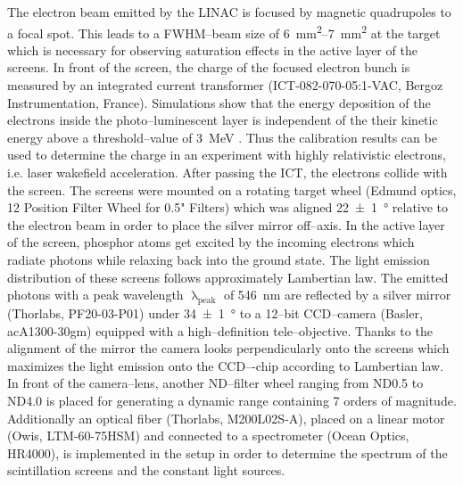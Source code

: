 \documentclass[%
reprint,
amsmath,
amssymb,
aip,
rsi, 
numerical,
floatfix,
]{revtex4-1}
\newcommand{\myCite}[1]{\textcolor{blue}{\cite{#1}}}
\begin{document}
The electron beam emitted by the LINAC is focused by magnetic quadrupoles to a focal spot.
This leads to a FWHM--beam size of \SIrange{6}{7}{\milli\metre^2} at the target which is necessary for observing saturation effects in the active layer of the screens. 
In front of the screen, the charge of the focused electron bunch is measured by an integrated current transformer (ICT-082-070-05:1-VAC, Bergoz Instrumentation, France).
Simulations show that the energy deposition of the electrons inside the photo--luminescent layer is independent of the their kinetic energy above a threshold--value of \SI{3}{\mega\electronvolt} \myCite{Hidding2007,Glinec2006,Masuda2008}.
Thus the calibration results can be used to determine the charge in an experiment with highly relativistic electrons, i.e. laser wakefield acceleration. 
After passing the ICT, the electrons collide with the screen. 
The screens were mounted on a rotating target wheel (Edmund optics, 12 Position Filter Wheel for 0.5" Filters) which was aligned \SI[separate-uncertainty = true]{22(1)}{\degree} relative to the electron beam in order to place the silver mirror off--axis. 
In the active layer of the screen, phosphor atoms get excited by the incoming electrons which radiate photons while relaxing back into the ground state. 
The light emission distribution of these screens follows approximately Lambertian law\myCite{Giakoumakis1985}. 
The emitted photons with a peak wavelength $\uplambda_{\text{peak}}$ of \SI{546}{\nano\metre} are reflected by a silver mirror (Thorlabs, PF20-03-P01) under \SI[separate-uncertainty = true]{34(1)}{\degree} to a 12–bit CCD–camera (Basler, acA1300-30gm) equipped with a high--definition tele--objective. 
Thanks to the alignment of the mirror the camera looks perpendicularly onto the screens which maximizes the light emission onto the CCD–-chip according to Lambertian law. 
In front of the camera--lens, another ND--filter wheel ranging from ND0.5 to ND4.0 is placed for generating a dynamic range containing 7 orders of magnitude. 
Additionally an optical fiber (Thorlabs, M200L02S-A), placed on a linear motor (Owis, LTM-60-75HSM) and connected to a spectrometer (Ocean Optics, HR4000), is implemented in the setup in order to determine the spectrum of the scintillation screens and the constant light sources. 
\end{document}
